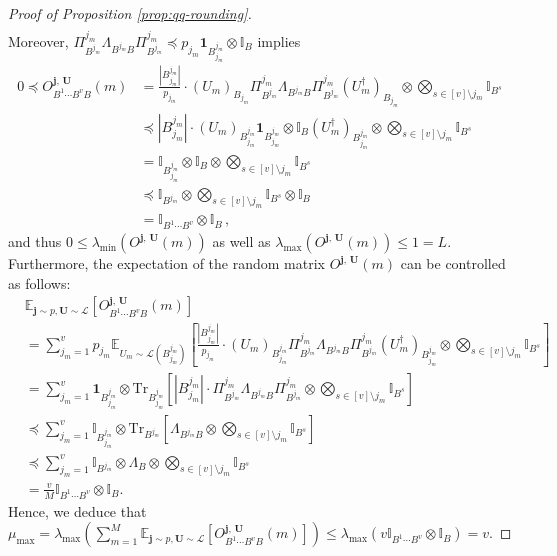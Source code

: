 \documentclass[a4paper,onecolumn,11pt,accepted=2025-10-01]{quantumarticle}
\newcommand*{\dI}{\mathbb{I}}
\newcommand*{\cL}{\mathcal{L}}
\newcommand*{\ptr}[2]{\mathrm{Tr}_{#1}\left[#2\right]}
\newcommand*{\mle}{\preccurlyeq}
\newcommand*{\exs}[2]{\mathbb{E}_{#1}\left[#2 \right]}
\begin{document}
\begin{proof}[Proof of Proposition \ref{prop:qq-rounding}]
\begin{align}
\end{align}
Moreover, $ \Pi_{B^{j_m}}^{j_m} \Lambda_{B^{j_m} B} \Pi_{B^{j_m}}^{j_m}\mle p_{j_m} \mathbf{1}_{B_{j_m}^{j_m}}\otimes \dI_B $ implies
\begin{align}
    0\mle O^{\bm{j}, \, \bm{U}}_{B^1 \cdots B^{v}B}(m) &= \tfrac{|B_{j_m}^{j_m}|}{p_{j_m}}\cdot (U_m)_{B_{j_m}}\Pi_{B^{j_m}}^{j_m} \Lambda_{B^{j_m} B} \Pi_{B^{j_m}}^{j_m}(U_m^\dagger)_{B_{j_m}} \otimes \bigotimes_{s\in [v]\setminus j_m} \dI_{B^s}
    \\&\mle |B_{j_m}^{j_m}|\cdot (U_m)_{B^{j_m}_{j_m}}\mathbf{1}_{B^{j_m}_{j_m}}\otimes \dI_B (U_m^\dagger)_{B^{j_m}_{j_m}} \otimes \bigotimes_{s\in [v]\setminus j_m} \dI_{B^s}
    \\&= \dI_{B_{j_m}^{j_m}}\otimes \dI_B\otimes \bigotimes_{s\in [v]\setminus j_m} \dI_{B^s}
    \\&\mle \dI_{B^{j_m}}\otimes \bigotimes_{s\in [v]\setminus j_m} \dI_{B^s}\otimes \dI_B
    \\&= \dI_{B^1\cdots B^{v}}\otimes \dI_B\,,
\end{align}
and thus $0\le\lambda_{\min}(O^{\bm{j}, \, \bm{U}}(m))$ as well as $\lambda_{\max}(O^{\bm{j}, \, \bm{U}}(m))\le 1 =L$.  Furthermore,  the expectation of the random matrix $O^{\bm{j}, \, \bm{U}}(m)$ can be  controlled  as follows:
\begin{align}
   & \exs{\bm{j}\sim p, \bm{U}\sim \cL}{O^{\bm{j}, \, \bm{U}}_{B^1 \cdots B^{v}B}(m)}
   \\&= \sum_{j_m=1}^v p_{j_m} \exs{U_m \sim \cL(B_{j_m}^{j_m})}{ \tfrac{ |B^{j_m}_{j_m}|}{p_{j_m}}\cdot (U_m)_{B_{j_m}^{j_m}}\Pi_{B^{j_m}}^{j_m} \Lambda_{B^{j_m} B} \Pi_{B^{j_m}}^{j_m}(U_m^\dagger)_{B_{j_m}^{j_m}}\otimes \bigotimes_{s\in [v]\setminus j_m} \dI_{B^s}}
   \\&= \sum_{j_m=1}^v \mathbf{1}_{B^{j_m}_{j_m}}\otimes\ptr{B^{j_m}_{j_m}}{ {|B^{j_m}_{j_m}|}\cdot \Pi_{B^{j_m}}^{j_m} \Lambda_{B^{j_m} B} \Pi_{B^{j_m}}^{j_m}\otimes \bigotimes_{s\in [v]\setminus j_m} \dI_{B^s}}
    \\&\mle  \sum_{j_m=1}^v  \dI_{B^{j_m}_{j_m}} \otimes \ptr{B^{j_m}}{\Lambda_{B^{j_m} B}\otimes \bigotimes_{s\in [v]\setminus j_m} \dI_{B^s}}
    \\&\mle   \sum_{j_m=1}^v  \dI_{B^{j_m}} \otimes \Lambda_{B} \otimes \bigotimes_{s\in [v]\setminus j_m} \dI_{B^s}
    \\&= \frac{v}{M}\dI_{B^1\cdots B^{v}}\otimes \dI_B.
\end{align}
Hence, we deduce that 
$\mu_{\max} = \lambda_{\max}\left(\sum_{m=1}^M \exs{\bm{j}\sim p, \bm{U}\sim \cL}{O^{\bm{j}, \, \bm{U}}_{B^1 \cdots B^{v}B}(m)}\right)\le \lambda_{\max}\left(v\dI_{B^1\cdots B^{v}}\otimes \dI_B\right)= v$. 

\end{proof}
\end{document}
